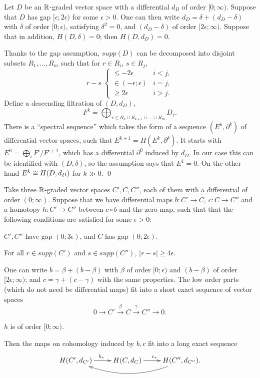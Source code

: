 \documentclass[10pt,letterpaper]{article}
\begin{document}
\begin{lemma} \label{th:spectral-sequence}
Let $D$ be an $\mathbb{R}$-graded vector space with a differential $d_D$ of order
$[0;\infty)$. Suppose that $D$ has gap $[\epsilon;2\epsilon)$ for some
$\epsilon>0$. One can then write $d_D = \delta + (d_D-\delta)$ with $\delta$ of
order $[0;\epsilon)$, satisfying $\delta^2 = 0$, and $(d_D-\delta)$ of order
$[2\epsilon;\infty)$. Suppose that in addition, $H(D,\delta) = 0$; then
$H(D,d_D) = 0$.
\end{lemma}

\proof Thanks to the gap assumption, $supp(D)$ can be decomposed into disjoint
subsets $R_1,\dots,R_m$ such that for $r \in R_i$, $s \in R_j$,
\[
r-s \; \begin{cases}
 \leq -2\epsilon & i < j, \\
 \in (-\epsilon;\epsilon) & i = j, \\
 \geq 2\epsilon & i > j.
\end{cases}
\]
Define a descending filtration of $(D,d_D)$,
\[
F^k = \textstyle\bigoplus_{r \in R_k \cup R_{k+1} \cup \dots \cup R_m} D_r.
\]
There is a ``spectral sequence'' which takes the form of a sequence
$(E^k,\partial^k)$ of differential vector spaces, such that $E^{k+1} =
H(E^k,\partial^k)$. It starts with $E^0 = \bigoplus_i F^i/F^{i+1}$, which has a
differential $\partial^0$ induced by $d_D$. In our case this can be identified
with $(D,\delta)$, so the assumption says that $E^1 = 0$. On the other hand
$E^k \cong H(D,d_D)$ for $k \gg 0$. \qed

\begin{lemma} \label{th:low-energy}
Take three $\mathbb{R}$-graded vector spaces $C',C,C''$, each of them with a
differential of order $(0;\infty)$. Suppose that we have differential maps $b:
C' \rightarrow C$, $c: C \rightarrow C''$ and a homotopy $h: C' \rightarrow
C''$ between $c \circ b$ and the zero map, such that that the following
conditions are satisfied for some $\epsilon>0$:
\begin{condensedlist}
\item \label{item:gap-one}
$C',C''$ have gap $(0;3\epsilon)$, and $C$ has gap $(0;2\epsilon)$.
\item \label{item:gap-two}
For all $r \in supp(C')$ and $s \in supp(C'')$, $|r-s| \geq 4\epsilon$.
\item \label{item:gap-three}
One can write $b = \beta + (b - \beta)$ with $\beta$ of order $[0;\epsilon)$
and $(b - \beta)$ of order $[2\epsilon;\infty)$; and $c = \gamma + (c-\gamma)$
with the same properties. The low order parts (which do not need be
differential maps) fit into a short exact sequence of vector spaces
\[
0 \rightarrow C' \xrightarrow{\beta} C \xrightarrow{\gamma} C'' \rightarrow 0.
\]
\item \label{item:gap-four}
$h$ is of order $[0;\infty)$.
\end{condensedlist}
Then the maps on cohomology induced by $b,c$ fit into a long exact sequence
\begin{equation} \label{eq:induced-sequence}
\xymatrix{
 {H(C',d_{C'})} \ar[r]^{b_*} & {H(C,d_C)} \ar[r]^{c_*} & {H(C'',d_{C''}).}
 \ar@/^1.5pc/[ll]^{ }
}
\end{equation}
\end{lemma}
\end{document}
